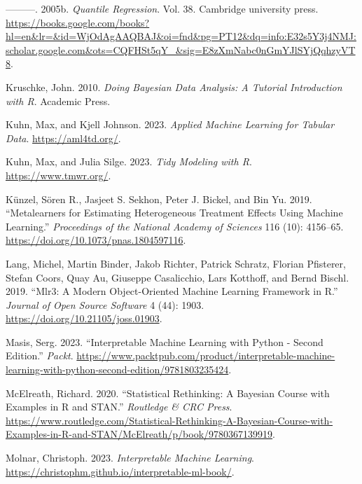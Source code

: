 \documentclass[
  letterpaper,
]{krantz}
\newlength{\cslhangindent}
\newenvironment{CSLReferences}[2] %
 {\begin{list}{}{%
  \setlength{\itemindent}{0pt}
  \setlength{\leftmargin}{0pt}
  \setlength{\parsep}{0pt}
  \ifodd #1
   \setlength{\leftmargin}{\cslhangindent}
   \setlength{\itemindent}{-1\cslhangindent}
  \fi
  \setlength{\itemsep}{#2\baselineskip}}}
 {\end{list}}
\begin{document}
\begin{CSLReferences}{1}{0}
---------. 2005b. \emph{Quantile Regression}. Vol. 38. Cambridge
university press.
\url{https://books.google.com/books?hl=en&lr=&id=WjOdAgAAQBAJ&oi=fnd&pg=PT12&dq=info:E32s5Y3j4NMJ:scholar.google.com&ots=CQFHSt5qY_&sig=E8zXmNabc0nGmYJlSYjQqhzyVT8}.

Kruschke, John. 2010. \emph{Doing {Bayesian} {Data} {Analysis}: {A}
{Tutorial} {Introduction} with {R}}. Academic Press.

Kuhn, Max, and Kjell Johnson. 2023. \emph{Applied {Machine} {Learning}
for {Tabular} {Data}}. \url{https://aml4td.org/}.

Kuhn, Max, and Julia Silge. 2023. \emph{Tidy {Modeling} with {R}}.
\url{https://www.tmwr.org/}.

Künzel, Sören R., Jasjeet S. Sekhon, Peter J. Bickel, and Bin Yu. 2019.
{``Metalearners for Estimating Heterogeneous Treatment Effects Using
Machine Learning.''} \emph{Proceedings of the National Academy of
Sciences} 116 (10): 4156--65.
\url{https://doi.org/10.1073/pnas.1804597116}.

Lang, Michel, Martin Binder, Jakob Richter, Patrick Schratz, Florian
Pfisterer, Stefan Coors, Quay Au, Giuseppe Casalicchio, Lars Kotthoff,
and Bernd Bischl. 2019. {``Mlr3: {A} Modern Object-Oriented Machine
Learning Framework in {R}.''} \emph{Journal of Open Source Software} 4
(44): 1903. \url{https://doi.org/10.21105/joss.01903}.

Masis, Serg. 2023. {``Interpretable {Machine} {Learning} with {Python} -
{Second} {Edition}.''} \emph{Packt}.
\url{https://www.packtpub.com/product/interpretable-machine-learning-with-python-second-edition/9781803235424}.

McElreath, Richard. 2020. {``Statistical {Rethinking}: {A} {Bayesian}
{Course} with {Examples} in {R} and {STAN}.''} \emph{Routledge \& CRC
Press}.
\url{https://www.routledge.com/Statistical-Rethinking-A-Bayesian-Course-with-Examples-in-R-and-STAN/McElreath/p/book/9780367139919}.

Molnar, Christoph. 2023. \emph{Interpretable {Machine} {Learning}}.
\url{https://christophm.github.io/interpretable-ml-book/}.


\end{CSLReferences}
\end{document}
